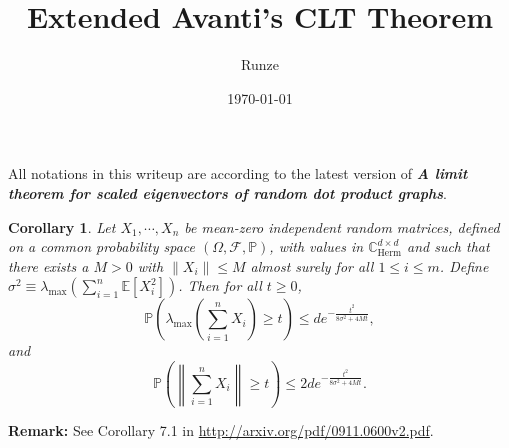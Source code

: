 \documentclass[a4paper]{article}
\title{Extended Avanti's CLT Theorem}
\author{Runze}
\date{\today}
\newtheorem{corollary}[fact]{Corollary}
\begin{document}
\maketitle

All notations in this writeup are according to the latest version of \textbf{\textit{A limit theorem for scaled eigenvectors of random dot product graphs}}.




\begin{corollary}
\label{cor:Xsum}
Let $X_1, \cdots, X_n$ be mean-zero independent random matrices, defined on a common probability space $(\Omega, \mathcal{F}, \mathbb{P})$, with values in $\mathbb{C}_{\mathrm{Herm}}^{d \times d}$ and such that there exists a $M > 0$ with $\|X_i\| \le M$ almost surely for all $1 \le i \le m$.
Define $\sigma^2 \equiv \lambda_{\max} \left( \sum_{i=1}^n \mathbb{E}[X_i^2] \right)$. Then for all $t\ge 0$,
\[
	\mathbb{P} \left( \lambda_{\max} \left( \sum_{i=1}^n X_i \right) \ge t \right) \le d e^{- \frac{t^2}{8 \sigma^2 + 4 M t}},
\]
and
\[
	\mathbb{P} \left( \left\| \sum_{i=1}^n X_i \right\| \ge t \right) \le 2d e^{- \frac{t^2}{8 \sigma^2 + 4 M t}}.
\]
\end{corollary}
\textbf{Remark:} See Corollary 7.1 in \href{url}{http://arxiv.org/pdf/0911.0600v2.pdf}.
\end{document}

